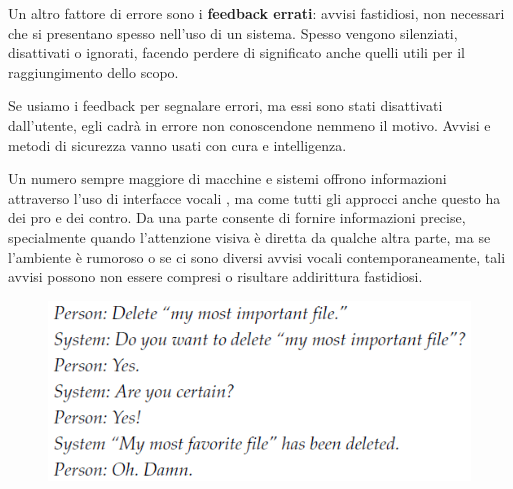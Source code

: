 \documentclass[a4paper,11pt,oneside]{book}
\begin{document}
Un altro fattore di errore sono i \textbf{feedback errati}: avvisi fastidiosi, non necessari che si presentano spesso nell'uso di un sistema. Spesso vengono silenziati, disattivati o ignorati, facendo perdere di significato anche quelli utili per il raggiungimento dello scopo.

Se usiamo i feedback per segnalare errori, ma essi sono stati disattivati dall'utente, egli cadrà in errore non conoscendone nemmeno il motivo. Avvisi e metodi di sicurezza vanno usati con cura e intelligenza.

Un numero sempre maggiore di macchine e sistemi offrono informazioni attraverso l'uso di interfacce vocali , ma come tutti gli approcci anche questo ha dei pro e
dei contro. Da una parte consente di fornire informazioni precise, specialmente quando
l'attenzione visiva è diretta da qualche altra parte, ma se l'ambiente è rumoroso o se ci sono diversi avvisi vocali contemporaneamente, tali avvisi possono non essere compresi o risultare addirittura fastidiosi.

\pagebreak

\begin{figure}[!h]
	\centering
	\includegraphics[scale=0.6]{immagini/Damn.png}
\end{figure}
\end{document}
